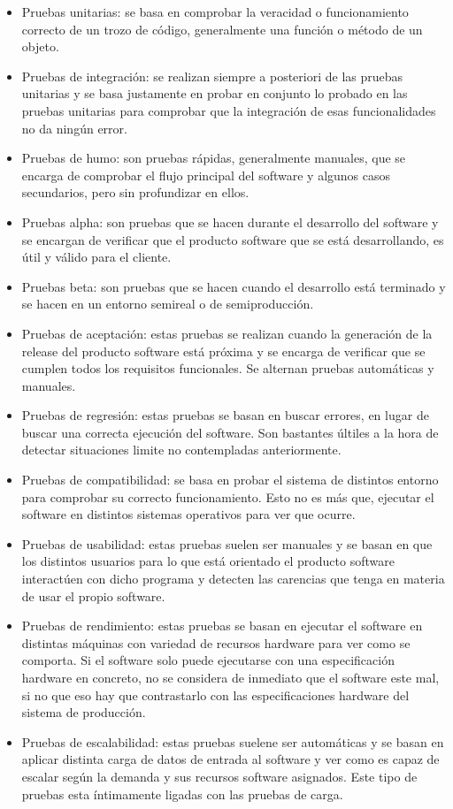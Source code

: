 \begin{itemize}
    \item Pruebas unitarias: se basa en comprobar la veracidad o funcionamiento correcto de un trozo de código, generalmente una función o método de un objeto.
    \item Pruebas de integración: se realizan siempre a posteriori de las pruebas unitarias y se basa justamente en probar en conjunto lo probado en las pruebas unitarias para comprobar que la integración de esas funcionalidades no da ningún error.
    \item Pruebas de humo: son pruebas rápidas, generalmente manuales, que se encarga de comprobar el flujo principal del software y algunos casos secundarios, pero sin profundizar en ellos.
    \item Pruebas alpha: son pruebas que se hacen durante el desarrollo del software y se encargan de verificar que el producto software que se está desarrollando, es útil y válido para el cliente.
    \item Pruebas beta: son pruebas que se hacen cuando el desarrollo está terminado y se hacen en un entorno semireal o de semiproducción.
    \item Pruebas de aceptación: estas pruebas se realizan cuando la generación de la release del producto software está próxima y se encarga de verificar que se cumplen todos los requisitos funcionales. Se alternan pruebas automáticas y manuales.
    \item Pruebas de regresión: estas pruebas se basan en buscar errores, en lugar de buscar una correcta ejecución del software. Son bastantes últiles a la hora de detectar situaciones limite no contempladas anteriormente.
    \item Pruebas de compatibilidad: se basa en probar el sistema de distintos entorno para comprobar su correcto funcionamiento. Esto no es más que, ejecutar el software en distintos sistemas operativos para ver que ocurre.
    \item Pruebas de usabilidad: estas pruebas suelen ser manuales y se basan en que los distintos usuarios para lo que está orientado el producto software interactúen con dicho programa y detecten las carencias que tenga en materia de usar el propio software.
    \item Pruebas de rendimiento: estas pruebas se basan en ejecutar el software en distintas máquinas con variedad de recursos hardware para ver como se comporta. Si el software solo puede ejecutarse con una especificación hardware en concreto, no se considera de inmediato que el software este mal, si no que eso hay que contrastarlo con las especificaciones hardware del sistema de producción.
    \item Pruebas de escalabilidad: estas pruebas suelene ser automáticas y se basan en aplicar distinta carga de datos de entrada al software y ver como es capaz de escalar según la demanda y sus recursos software asignados. Este tipo de pruebas esta íntimamente ligadas con las pruebas de carga.
\end{itemize}

